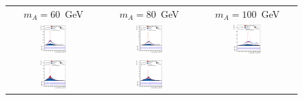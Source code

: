 \documentclass[preprintnumbers,superscriptaddress,nofootinbib,aps,prd,floatfix]{revtex4}
\begin{document}
\begin{figure}[htbp]
\begin{center}
\begin{tabular}{ccc}
$m_A = 60$~GeV & $m_A = 80$~GeV &  $m_A = 100$~GeV \\
\includegraphics[width=0.3\textwidth]{Figures/21stJuly/tta60/VD_1.eps} &
\includegraphics[width=0.3\textwidth]{Figures/21stJuly/tta80/VD_1.eps} &
\includegraphics[width=0.3\textwidth]{Figures/21stJuly/tta100/VD_1.eps} \\
\includegraphics[width=0.3\textwidth]{Figures/21stJuly/tta60/VD_2.eps} &
\includegraphics[width=0.3\textwidth]{Figures/21stJuly/tta80/VD_2.eps} &

\end{tabular}
\end{center}
\end{figure}
\end{document}
